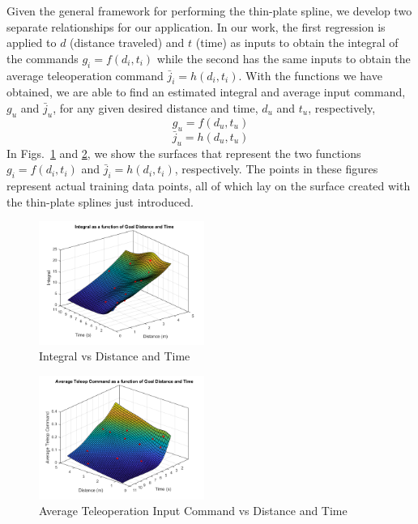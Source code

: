 \documentclass[letterpaper, 10 pt, conference]{ieeeconf}  %
\begin{document}
Given the general framework for performing the thin-plate spline, we develop two separate relationships for our application. In our work, the first regression is applied to $d$ (distance traveled) and $t$ (time) as inputs to obtain the integral of the commands $g_i = f(d_i,t_i)$ while the second has the same inputs to obtain the average teleoperation command $\bar{j}_i = h(d_i,t_i)$. With the functions we have obtained, we are able to find an estimated integral and average input command, $g_u$ and $\bar{j}_u$, for any given desired distance and time, $d_u$ and $t_u$, respectively,
\begin{equation} \label{eq:integralfit}
g_u = f(d_u,t_u)
\end{equation}
\begin{equation} \label{eq:ssvelfit}
\bar{j}_u = h(d_u,t_u)
\end{equation}
In Figs.~\ref{fig:integs} and \ref{fig:joys}, we show the surfaces that represent the two functions $g_i = f(d_i,t_i)$ and $\bar{j}_i = h(d_i,t_i)$, respectively. The points in these figures represent actual training data points, all of which lay on the surface created with the thin-plate splines just introduced.

\begin{figure}[ht]
    \includegraphics[width=0.48\textwidth]{images/integs.png}
    \caption{Integral vs Distance and Time}
    \label{fig:integs}
\end{figure}
\begin{figure}[ht]
    \includegraphics[width=0.48\textwidth]{images/joycmds.png}
    \caption{Average Teleoperation Input Command vs Distance and Time}
    \label{fig:joys}
\end{figure}
\end{document}
